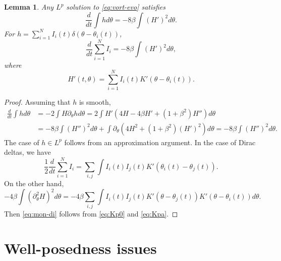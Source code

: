 \documentclass[10pt]{amsart}
\theoremstyle{plain}
\newtheorem{lemma}[theorem]{Lemma}
\theoremstyle{definition}
\let\rd\partial
\let\bt\beta
\let\dlt\delta
\let\tht\theta
\begin{document}

\begin{lemma}\label{lem:mon}
Any $L^p$ solution to \eqref{eq:vort-evo} satisfies\vspace*{-3pt}
\begin{equation}\label{eq:mon}
\frac{d}{dt} \int h d\tht = -8\bt \int (H')^2 d\tht.
\end{equation}
For $h = \sum_{i=1}^{N} I_i(t) \dlt(\tht-\tht_i(t))$,\vspace*{-3pt}
\begin{equation}\label{eq:mon-di}
\frac{d}{dt} \sum_{i=1}^{N} I_{i} = - 8\bt \int (H')^2 d\tht,
\end{equation}
where\vspace*{-3pt}
\begin{equation*}
H'(t,\tht) = \sum_{i=1}^{N} I_i(t) K'(\tht-\tht_i(t)).
\end{equation*}
\end{lemma}
\begin{proof}
Assuming that $h$ is smooth,\vspace*{-3pt}
\begin{equation*}
\begin{split}
\frac{d}{dt} \int h d\tht & = -2 \int H\rd_\tht h d\tht = 2\int H' (4H - 4\bt H' + (1+\bt^2) H'') d\tht \\
& = -8\bt \int (H'')^2 d\tht + \int \rd_\tht \left(4H^2 + (1+\bt^2) (H')^2 \right) d\tht = -8\bt \int (H'')^2 d\tht.
\end{split}
\end{equation*}
The case of $h\in L^p$ follows from an approximation argument. In the case of Dirac deltas, we have\vspace*{-3pt}
\begin{equation*}
\frac12 \frac{d}{dt} \sum_{i=1}^{N} I_{i} = \sum_{i,j} \int I_i(t) I_j(t) K'(\tht_i(t)-\tht_j(t)).
\end{equation*}
On the other hand,\vspace*{-3pt}
\begin{equation*}
-4\bt \int (\partial^2_{\theta} H)^2 d\tht = -4\bt \sum_{i,j} \int I_i(t)I_j(t) K'(\tht-\tht_j(t))K'(\tht-\tht_i(t)) d\tht.
\end{equation*}
Then \eqref{eq:mon-di} follows from \eqref{eq:Kp0} and \eqref{eq:Kpa}.
\end{proof}

\section{Well-posedness issues}\label{sec:wp}
\end{document}
